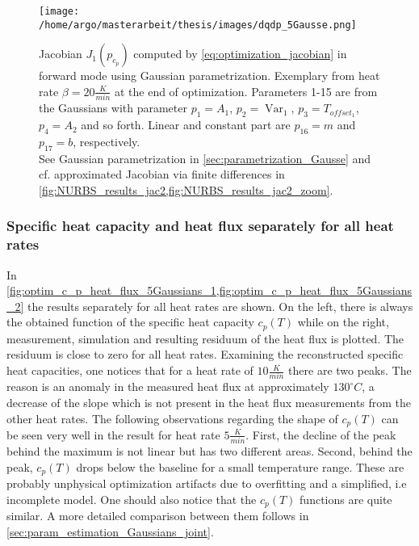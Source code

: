 \documentclass{scrartcl}[12pt, halfparskip]
\numberwithin{equation}{section}
\numberwithin{figure}{section}
\numberwithin{table}{section}
\newcommand{\var}{\operatorname{Var}}
\begin{document}
\begin{figure}[H]
	\centering
	\texttt{[image: /home/argo/masterarbeit/thesis/images/dqdp\_5Gausse.png]}
	\caption{Jacobian $J_1(p_{c_p})$ computed by \cref{eq:optimization_jacobian} in forward mode using Gaussian parametrization. Exemplary from heat rate $\beta=20 \frac{K}{min}$ at the end of optimization. Parameters 1-15 are from the Gaussians with parameter $p_1 = A_1$, $p_2 = \var_1$, $p_3 = T_{offset_1}$, $p_4 = A_2$ and so forth. Linear and constant part are $p_{16}=m$ and $p_{17}=b$, respectively. \\
	See Gaussian parametrization in \cref{sec:parametrization_Gausse} and cf. approximated Jacobian via finite differences in \cref{fig:NURBS_results_jac2,fig:NURBS_results_jac2_zoom}.}
	\label{fig:dqdp_5Gausse}
\end{figure}


\subsubsection{Specific heat capacity and heat flux separately for all heat rates}
\label{sec:param_estimation_5Gaussians_c_p_heat_flux_seperately}

In \cref{fig:optim_c_p_heat_flux_5Gaussians_1,fig:optim_c_p_heat_flux_5Gaussians_2} the results separately for all heat rates are shown. On the left, there is always the obtained function of the specific heat capacity $c_p(T)$ while on the right, measurement, simulation and resulting residuum of the heat flux is plotted. 
The residuum is close to zero for all heat rates. Examining the reconstructed specific heat capacities, one notices that for a heat rate of $10 \frac{K}{min}$ there are two peaks. 
The reason is an anomaly in the measured heat flux at approximately $130^{\circ} C$, a decrease of the slope which is not present in the heat flux measurements from the other heat rates. 
The following observations regarding the shape of $c_p(T)$ can be seen very well in the result for heat rate $5 \frac{K}{min}$. 
First, the decline of the peak behind the maximum is not linear but has two different areas. 
Second, behind the peak, $c_p(T)$ drops below the baseline for a small temperature range. 
These are probably unphysical optimization artifacts due to overfitting and a simplified, i.e incomplete model. 
One should also notice that the $c_p(T)$ functions are quite similar.
A more detailed comparison between them follows in \cref{sec:param_estimation_Gaussians_joint}.
\end{document}
